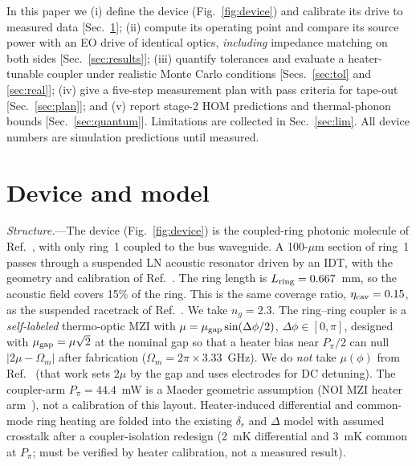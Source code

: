 \documentclass[aps,prapplied,reprint,superscriptaddress,amsmath,amssymb,floatfix]{revtex4-2}
\begin{document}
In this paper we (i) define the device (Fig.~\ref{fig:device}) and calibrate its drive to measured data [Sec.~\ref{sec:model}]; (ii) compute its operating point and compare its source power with an EO drive of identical optics, \emph{including} impedance matching on both sides [Sec.~\ref{sec:results}]; (iii) quantify tolerances and evaluate a heater-tunable coupler under realistic Monte Carlo conditions [Secs.~\ref{sec:tol} and \ref{sec:real}]; (iv) give a five-step measurement plan with pass criteria for tape-out [Sec.~\ref{sec:plan}]; and (v) report stage-2 HOM predictions and thermal-phonon bounds [Sec.~\ref{sec:quantum}]. Limitations are collected in Sec.~\ref{sec:lim}. All device numbers are simulation predictions until measured.

\section{Device and model}\label{sec:model}
\emph{Structure.}---The device (Fig.~\ref{fig:device}) is the coupled-ring photonic molecule of Ref.~\cite{Hu2021}, with only ring~1 coupled to the bus waveguide. A 100-$\mu$m section of ring~1 passes through a suspended LN acoustic resonator driven by an IDT, with the geometry and calibration of Ref.~\cite{Shao2019}. The ring length is $L_{\rm ring}=0.667$~mm, so the acoustic field covers 15\% of the ring. This is the same coverage ratio, $\eta_{\rm cav}=0.15$, as the suspended racetrack of Ref.~\cite{Shao2019}. We take $n_g=2.3$. The ring--ring coupler is a \emph{self-labeled} thermo-optic MZI with $\mu=\mu_{\rm gap}\sin(\Delta\phi/2)$, $\Delta\phi\in[0,\pi]$, designed with $\mu_{\rm gap}=\mu\sqrt{2}$ at the nominal gap so that a heater bias near $P_\pi/2$ can null $|2\mu-\Omega_m|$ after fabrication ($\Omega_m=2\pi\times3.33$~GHz). We do \emph{not} take $\mu(\phi)$ from Ref.~\cite{Zhang2019} (that work sets $2\mu$ by the gap and uses electrodes for DC detuning). The coupler-arm $P_\pi=44.4$~mW is a Maeder geometric assumption (NOI MZI heater arm~\cite{Maeder2024LNOIMZI}), not a calibration of this layout. Heater-induced differential and common-mode ring heating are folded into the existing $\delta_r$ and $\Delta$ model with assumed crosstalk after a coupler-isolation redesign (2~mK differential and 3~mK common at $P_\pi$; must be verified by heater calibration, not a measured result).
\end{document}
